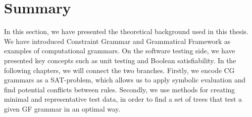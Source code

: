 




\section{Summary}

In this section, we have presented the theoretical background used in this thesis.  We have introduced Constraint Grammar and Grammatical Framework as examples of computational grammars.  On the software testing side, we have presented key concepts such as unit testing and Boolean satisfiability. In the following chapters, we will connect the two branches. Firstly, we encode CG grammars as a SAT-problem, which allows us to apply symbolic evaluation and find potential conflicts between rules.  Secondly, we use methods for creating minimal and representative test data, in order to find a set of trees that test a given GF grammar in an optimal way.



